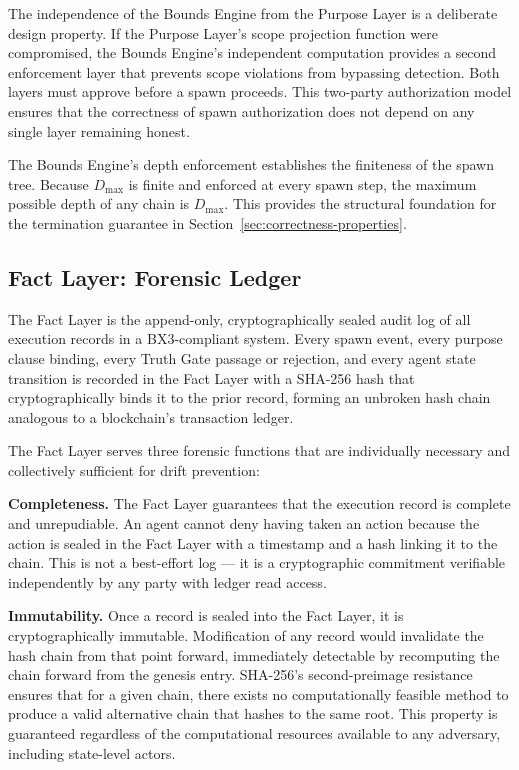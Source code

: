 The independence of the Bounds Engine from the Purpose Layer is a deliberate design property. If the Purpose Layer's scope projection function were compromised, the Bounds Engine's independent computation provides a second enforcement layer that prevents scope violations from bypassing detection. Both layers must approve before a spawn proceeds. This two-party authorization model ensures that the correctness of spawn authorization does not depend on any single layer remaining honest.

The Bounds Engine's depth enforcement establishes the finiteness of the spawn tree. Because $D_{\max}$ is finite and enforced at every spawn step, the maximum possible depth of any chain is $D_{\max}$. This provides the structural foundation for the termination guarantee in Section~\ref{sec:correctness-properties}.

\subsection{Fact Layer: Forensic Ledger}

The Fact Layer is the append-only, cryptographically sealed audit log of all execution records in a BX3-compliant system. Every spawn event, every purpose clause binding, every Truth Gate passage or rejection, and every agent state transition is recorded in the Fact Layer with a SHA-256 hash that cryptographically binds it to the prior record, forming an unbroken hash chain analogous to a blockchain's transaction ledger.

The Fact Layer serves three forensic functions that are individually necessary and collectively sufficient for drift prevention:

\bigskip
\noindent\textbf{Completeness.} The Fact Layer guarantees that the execution record is complete and unrepudiable. An agent cannot deny having taken an action because the action is sealed in the Fact Layer with a timestamp and a hash linking it to the chain. This is not a best-effort log — it is a cryptographic commitment verifiable independently by any party with ledger read access.

\bigskip
\noindent\textbf{Immutability.} Once a record is sealed into the Fact Layer, it is cryptographically immutable. Modification of any record would invalidate the hash chain from that point forward, immediately detectable by recomputing the chain forward from the genesis entry. SHA-256's second-preimage resistance ensures that for a given chain, there exists no computationally feasible method to produce a valid alternative chain that hashes to the same root. This property is guaranteed regardless of the computational resources available to any adversary, including state-level actors.

